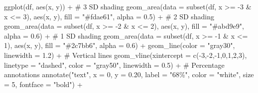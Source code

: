 \documentclass[
  12pt,
  letterpaper,
]{book}
\newenvironment{Shaded}{\begin{snugshade}}{\end{snugshade}}
\newcommand{\AttributeTok}[1]{\textcolor[rgb]{0.40,0.45,0.13}{#1}}
\newcommand{\CommentTok}[1]{\textcolor[rgb]{0.37,0.37,0.37}{#1}}
\newcommand{\DecValTok}[1]{\textcolor[rgb]{0.68,0.00,0.00}{#1}}
\newcommand{\FloatTok}[1]{\textcolor[rgb]{0.68,0.00,0.00}{#1}}
\newcommand{\FunctionTok}[1]{\textcolor[rgb]{0.28,0.35,0.67}{#1}}
\newcommand{\NormalTok}[1]{\textcolor[rgb]{0.00,0.23,0.31}{#1}}
\newcommand{\SpecialCharTok}[1]{\textcolor[rgb]{0.37,0.37,0.37}{#1}}
\newcommand{\StringTok}[1]{\textcolor[rgb]{0.13,0.47,0.30}{#1}}
\begin{document}
\begin{Shaded}
\begin{Highlighting}[]
\FunctionTok{ggplot}\NormalTok{(df, }\FunctionTok{aes}\NormalTok{(x, y)) }\SpecialCharTok{+}
  \CommentTok{\# 3 SD shading}
  \FunctionTok{geom\_area}\NormalTok{(}\AttributeTok{data =} \FunctionTok{subset}\NormalTok{(df, x }\SpecialCharTok{\textgreater{}=} \SpecialCharTok{{-}}\DecValTok{3} \SpecialCharTok{\&}\NormalTok{ x }\SpecialCharTok{\textless{}=} \DecValTok{3}\NormalTok{),}
            \FunctionTok{aes}\NormalTok{(x, y), }\AttributeTok{fill =} \StringTok{"\#fdae61"}\NormalTok{, }\AttributeTok{alpha =} \FloatTok{0.5}\NormalTok{) }\SpecialCharTok{+}
  \CommentTok{\# 2 SD shading}
  \FunctionTok{geom\_area}\NormalTok{(}\AttributeTok{data =} \FunctionTok{subset}\NormalTok{(df, x }\SpecialCharTok{\textgreater{}=} \SpecialCharTok{{-}}\DecValTok{2} \SpecialCharTok{\&}\NormalTok{ x }\SpecialCharTok{\textless{}=} \DecValTok{2}\NormalTok{),}
            \FunctionTok{aes}\NormalTok{(x, y), }\AttributeTok{fill =} \StringTok{"\#abd9e9"}\NormalTok{, }\AttributeTok{alpha =} \FloatTok{0.6}\NormalTok{) }\SpecialCharTok{+}
  \CommentTok{\# 1 SD shading}
  \FunctionTok{geom\_area}\NormalTok{(}\AttributeTok{data =} \FunctionTok{subset}\NormalTok{(df, x }\SpecialCharTok{\textgreater{}=} \SpecialCharTok{{-}}\DecValTok{1} \SpecialCharTok{\&}\NormalTok{ x }\SpecialCharTok{\textless{}=} \DecValTok{1}\NormalTok{),}
            \FunctionTok{aes}\NormalTok{(x, y), }\AttributeTok{fill =} \StringTok{"\#2c7bb6"}\NormalTok{, }\AttributeTok{alpha =} \FloatTok{0.6}\NormalTok{) }\SpecialCharTok{+}
  \FunctionTok{geom\_line}\NormalTok{(}\AttributeTok{color =} \StringTok{"gray30"}\NormalTok{, }\AttributeTok{linewidth =} \FloatTok{1.2}\NormalTok{) }\SpecialCharTok{+}
  \CommentTok{\# Vertical lines}
  \FunctionTok{geom\_vline}\NormalTok{(}\AttributeTok{xintercept =} \FunctionTok{c}\NormalTok{(}\SpecialCharTok{{-}}\DecValTok{3}\NormalTok{,}\SpecialCharTok{{-}}\DecValTok{2}\NormalTok{,}\SpecialCharTok{{-}}\DecValTok{1}\NormalTok{,}\DecValTok{0}\NormalTok{,}\DecValTok{1}\NormalTok{,}\DecValTok{2}\NormalTok{,}\DecValTok{3}\NormalTok{),}
             \AttributeTok{linetype =} \StringTok{"dashed"}\NormalTok{, }\AttributeTok{color =} \StringTok{"gray50"}\NormalTok{, }\AttributeTok{linewidth =} \FloatTok{0.5}\NormalTok{) }\SpecialCharTok{+}
  \CommentTok{\# Percentage annotations}
  \FunctionTok{annotate}\NormalTok{(}\StringTok{"text"}\NormalTok{, }\AttributeTok{x =} \DecValTok{0}\NormalTok{, }\AttributeTok{y =} \FloatTok{0.20}\NormalTok{,}
           \AttributeTok{label =} \StringTok{"68\%"}\NormalTok{, }\AttributeTok{color =} \StringTok{"white"}\NormalTok{, }\AttributeTok{size =} \DecValTok{5}\NormalTok{, }\AttributeTok{fontface =} \StringTok{"bold"}\NormalTok{) }\SpecialCharTok{+}

\end{Highlighting}
\end{Shaded}
\end{document}
